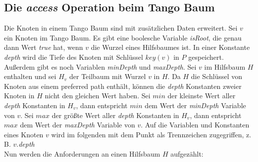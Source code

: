 \documentclass[a4paper,12pt]{article}
\begin{document}
\subsection{Die \textit{access} Operation beim Tango Baum}
Die Knoten in einem Tango Baum sind mit zusätzlichen Daten erweitert. Sei $v$ ein Knoten im Tango Baum. Es gibt eine boolesche Variable \textit{isRoot}, die genau dann Wert \textit{true} hat, wenn $v$ die Wurzel eines Hilfsbaumes ist. In einer Konstante \textit{depth} wird die Tiefe des Knoten mit Schlüssel $\mathit{key}\left(v\right)$ in $P$ gespeichert. Außerdem gibt es noch Variablen \textit{minDepth} und \textit{maxDepth}. Sei $v$ im Hilfsbaum $H$ enthalten und sei $H_v$ der Teilbaum mit Wurzel $v$ in $H$. Da $H$ die Schlüssel von Knoten aus einem preferred path enthält, können die \textit{depth} Konstanten zweier Knoten in $H$ nicht den gleichen Wert haben. Sei $\mathit{min}$ der kleinste Wert aller \textit{depth} Konstanten in $H_v$, dann entspricht $\mathit{min}$ dem  Wert der \textit{minDepth} Variable von $v$. Sei $\mathit{max}$ der größte Wert aller \textit{depth} Konstanten in $H_v$, dann entspricht $\mathit{max}$ dem  Wert der \textit{maxDepth} Variable von $v$. Auf die Variablen und Konstanten eines Knoten $v$ wird im folgenden mit dem Punkt als Trennzeichen zugegriffen, z. B. $v$.\textit{depth} \\
Nun werden die Anforderungen an einen Hilfsbaum $H$ aufgezählt:
\end{document}
